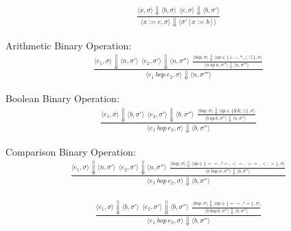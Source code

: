 \documentclass[12pt]{article}
\begin{document}
	\begin{align*}
		\frac{
			\langle x, \sigma \rangle\Downarrow \langle b, \sigma \rangle \ \ 
			\langle e, \sigma \rangle\Downarrow \langle b, \sigma' \rangle
		}
		{\langle x := e, \sigma \rangle\Downarrow \langle \sigma' [x := b] \rangle}
	\end{align*}


	Arithmetic Binary Operation:
	\begin{align*}
		\frac{
		\langle e_1, \sigma \rangle\Downarrow \langle n, \sigma' \rangle \ \ 
		\langle e_2, \sigma' \rangle\Downarrow \langle n, \sigma'' \rangle \ \ 
		\frac{
			\langle bop, \sigma \rangle\Downarrow \langle op \in \{+. -, *, /, \%\} , \sigma \rangle
		}{
			\langle n\ op\ n, \sigma'' \rangle\Downarrow \langle n, \sigma''' \rangle \ \ 
		}}
		{\langle e_1\ bop\ e_2, \sigma \rangle\Downarrow \langle n, \sigma''' \rangle}
	\end{align*}


	Boolean Binary Operation:
	\begin{align*}
		\frac{
		\langle e_1, \sigma \rangle\Downarrow \langle b, \sigma' \rangle \ \ 
		\langle e_2, \sigma' \rangle\Downarrow \langle b, \sigma'' \rangle \ \ 
		\frac{
			\langle bop, \sigma \rangle\Downarrow \langle op \in \{\&\&, ||\} , \sigma \rangle
		}{
			\langle b\ op\ b, \sigma'' \rangle\Downarrow \langle b, \sigma'' \rangle \ \ 
		}}
		{\langle e_1\ bop\ e_2, \sigma \rangle\Downarrow \langle b, \sigma'' \rangle}
	\end{align*}


	Comparison Binary Operation:
	\begin{align*}
		\frac{
		\langle e_1, \sigma \rangle\Downarrow \langle n, \sigma' \rangle \ \ 
		\langle e_2, \sigma' \rangle\Downarrow \langle n, \sigma'' \rangle \ \
		\frac{
			\langle bop, \sigma \rangle\Downarrow \langle op \in \{==, !=, <=, >=, <, >\} , \sigma \rangle
		}{
			\langle n\ bop\ n, \sigma'' \rangle\Downarrow \langle b, \sigma'' \rangle
		}}
		{\langle e_1\ bop\ e_2, \sigma \rangle\Downarrow \langle b, \sigma'' \rangle}
	\end{align*}
	
	\begin{align*}
		\frac{
		\langle e_1, \sigma \rangle\Downarrow \langle b, \sigma' \rangle \ \ 
		\langle e_2, \sigma' \rangle\Downarrow \langle b, \sigma'' \rangle \ \
		\frac{
			\langle bop, \sigma \rangle\Downarrow \langle op \in \{==, !=\} , \sigma \rangle
		}{
			\langle b\ bop\ b, \sigma'' \rangle\Downarrow \langle b, \sigma'' \rangle
		}}
		{\langle e_1\ bop\ e_2, \sigma \rangle\Downarrow \langle b, \sigma'' \rangle}
	\end{align*}
\end{document}
